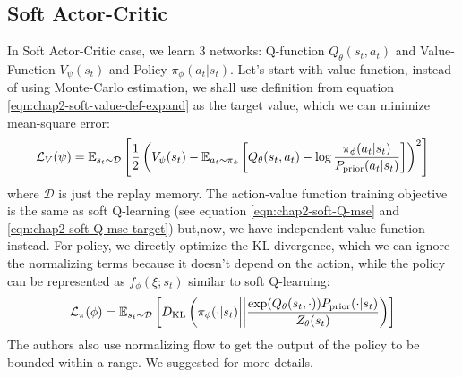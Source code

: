 \subsection{Soft Actor-Critic}
\label{sec:chap2-soft-ac-implement}

In Soft Actor-Critic case, we learn 3 networks: Q-function $Q_{\theta} (s_t, a_t)$ and Value-Function $V_{\psi}(s_t)$ and Policy $\pi_{\phi}(a_t | s_t)$. Let's start with value function, instead of using Monte-Carlo estimation, we shall use definition from equation \ref{eqn:chap2-soft-value-def-expand} as the target value, which we can minimize mean-square error:
\begin{equation}
    \mathcal{L}_V(\psi) = \mathbb{E}_{s_t \sim \mathcal{D}} \left[ \frac{1}{2} \left( V_{\psi}(s_t) - \mathbb{E}_{a_t \sim \pi_{\phi}}\left[ Q_{\theta}(s_t, a_t) - \log \frac{\pi_{\phi}(a_t | s_t)}{P_{\text{prior}}(a_t | s_t)} \right] \right)^2 \right]
\end{equation}
where $\mathcal{D}$ is just the replay memory. The action-value function training objective is the same as soft Q-learning (see equation \ref{eqn:chap2-soft-Q-mse} and \ref{eqn:chap2-soft-Q-mse-target}) but,now, we have independent value function instead. For policy, we directly optimize the KL-divergence, which we can ignore the normalizing terms because it doesn't depend on the action, while the policy can be represented as $f_\phi(\xi ; s_t)$ similar to soft Q-learning:
\begin{equation}
    \mathcal{L}_{\pi}(\phi) = \mathbb{E}_{s_t \sim \mathcal{D}} \left[ D_{\mathrm{KL}}\left( \pi_{\phi}(\cdot | s_t) \bigg| \bigg| \frac{\exp(Q_{\theta}(s_t, \cdot)) P_{\text{prior}}(\cdot | s_t)}{Z_{\theta}(s_t)} \right) \right]
\end{equation}
The authors also use normalizing flow to get the output of the policy to be bounded within a range. We suggested \cite{haarnoja2018softa} for more details.
